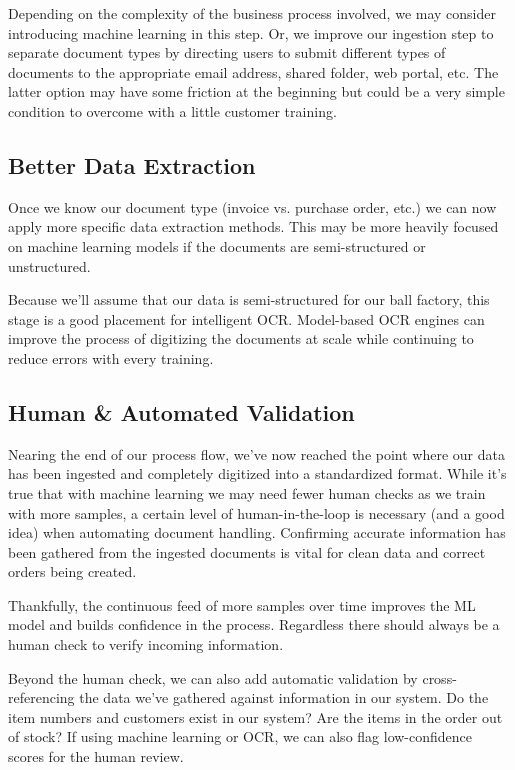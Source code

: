 \documentclass[conference]{IEEEtran}
\begin{document}
Depending on the complexity of the business process involved, we may consider introducing machine learning in this step. Or, we improve our ingestion step to separate document types by directing users to submit different types of documents to the appropriate email address, shared folder, web portal, etc. The latter option may have some friction at the beginning but could be a very simple condition to overcome with a little customer training.

\subsection{Better Data Extraction}
Once we know our document type (invoice vs. purchase order, etc.) we can now apply more specific data extraction methods. This may be more heavily focused on machine learning models if the documents are semi-structured or unstructured.

Because we'll assume that our data is semi-structured for our ball factory, this stage is a good placement for intelligent OCR. Model-based OCR engines can improve the process of digitizing the documents at scale while continuing to reduce errors with every training.

\subsection{Human \& Automated Validation}
Nearing the end of our process flow, we've now reached the point where our data has been ingested and completely digitized into a standardized format. While it's true that with machine learning we may need fewer human checks as we train with more samples, a certain level of human-in-the-loop is necessary (and a good idea) when automating document handling. Confirming accurate information has been gathered from the ingested documents is vital for clean data and correct orders being created.

Thankfully, the continuous feed of more samples over time improves the ML model and builds confidence in the process. Regardless there should always be a human check to verify incoming information.

Beyond the human check, we can also add automatic validation by cross-referencing the data we've gathered against information in our system. Do the item numbers and customers exist in our system? Are the items in the order out of stock? If using machine learning or OCR, we can also flag low-confidence scores for the human review.
\end{document}
